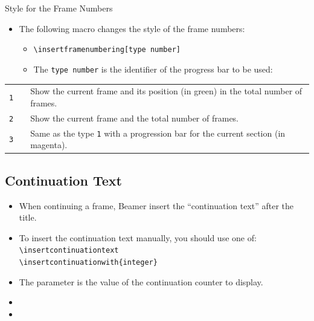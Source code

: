 \documentclass[english,sectioncirclenumberstyle]{ciadbeamer}
\begin{document}
\begin{frame}[label=progressbartypes,t]{Style for the Frame Numbers}
	\begin{itemize}
	\item The following macro changes the style of the frame numbers:
		\begin{itemize}
		\item \texttt{{\textbackslash}insertframenumbering[type number]}
		\item The \texttt{type number} is the identifier of the progress bar to be used:
		\end{itemize}
	\end{itemize}
	\begin{tabularx}{\linewidth}{|c|c|X|}
	\hline
	\tabularheading\chead{Type number} & \chead{Output} & \chead{Explanation} \\
	\hline
	\texttt{1} & \insertframenumbering[1] & Show the current frame and its position (in green) in the total number of frames. \\
	\hline
	\texttt{2} & \colorbox{footline.bg}{\tiny\insertframenumbering[2]} & Show the current frame and the total number of frames. \\
	\hline
	\texttt{3} & \insertframenumbering[3] & Same as the type \texttt{1} with a progression bar for the current section (in magenta). \\
	\hline
	\end{tabularx}
\end{frame}

\subsection{Continuation Text}
\begin{frame}{\subsecname}
	\begin{itemize}
	\item When continuing a frame, Beamer insert the ``continuation text'' after the title.
	\vfill
	\item To insert the continuation text manually, you should use one of:
		\texttt{{\textbackslash}insertcontinuationtext} \\
		\texttt{{\textbackslash}insertcontinuationwith\{integer\}}
	\item The parameter is the value of the continuation counter to display.
	\vfill
	\item {}
	\item {}
	\end{itemize}
\end{frame}
\end{document}
